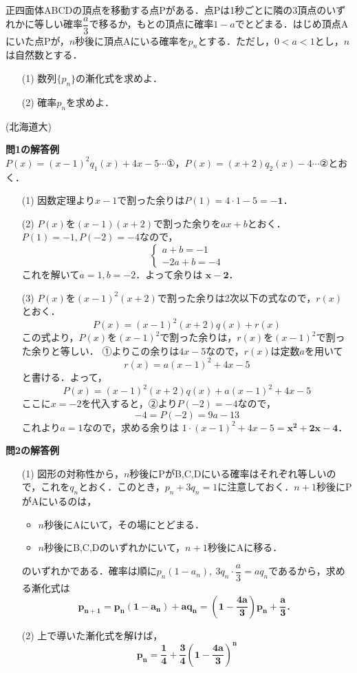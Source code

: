 \documentclass[a4paper,11pt]{ltjsarticle}
\begin{document}
\begin{toi}
正四面体ABCDの頂点を移動する点Pがある．点Pは1秒ごとに隣の3頂点のいずれかに等しい確率$\dfrac a3$で移るか，もとの頂点に確率$1-a$でとどまる．はじめ頂点Aにいた点Pが，$n$秒後に頂点Aにいる確率を$p_n$とする．ただし，$0<a<1$とし，$n$は自然数とする．
\begin{itemize}
    \item [(1)]数列$\{p_n\}$の漸化式を求めよ．
    \item [(2)]確率$p_n$を求めよ．
\end{itemize}
\hfill(北海道大)
\end{toi}

\newpage
\noindent \textbf{問1の解答例}\\[5pt]
$P(x)=(x-1)^2q_1(x)+4x-5 \cdots$①，$P(x)=(x+2)q_2(x)-4 \cdots$②とおく．
\begin{enumerate}
  \item[(1)] 因数定理より$x-1$で割った余りは$P(1)=4\cdot1-5=\boldsymbol{-1}$．
  \item [(2)] $P(x)$を$(x-1)(x+2)$で割った余りを$ax+b$とおく．
  $P(1)=-1, P(-2)=-4$なので，
  \[\begin{cases}
  a+b=-1 \\ -2a+b=-4
  \end{cases}\]
  これを解いて$a=1, b=-2$．よって余りは $\boldsymbol{x-2}$．
  \item[(3)] $P(x)$を$(x-1)^2(x+2)$で割った余りは2次以下の式なので，$r(x)$とおく．
  \[P(x)=(x-1)^2(x+2)q(x)+r(x)\]
  この式より，$P(x)$を$(x-1)^2$で割った余りは，$r(x)$を$(x-1)^2$で割った余りと等しい．
  ①よりこの余りは$4x-5$なので，$r(x)$は定数$a$を用いて
  \[r(x)=a(x-1)^2+4x-5\]
  と書ける．よって，
  \[P(x)=(x-1)^2(x+2)q(x)+a(x-1)^2+4x-5\]
  ここに$x=-2$を代入すると，②より$P(-2)=-4$なので，
  \[-4=P(-2)=9a-13\]
これより$a=1$なので，求める余りは $1\cdot(x-1)^2+4x-5 =\boldsymbol{x^2+2x-4}$．
\end{enumerate}
\textbf{問2の解答例}
\begin{itemize}
    \item [(1)]図形の対称性から，$n$秒後にPがB,C,Dにいる確率はそれぞれ等しいので，これを$q_n$とおく．このとき，$p_n+3q_n=1$に注意しておく．$n+1$秒後にPがAにいるのは，
\begin{itemize}
    \item $n$秒後にAにいて，その場にとどまる．
    \item $n$秒後にB,C,Dのいずれかにいて，$n+1$秒後にAに移る．
\end{itemize}
のいずれかである．確率は順に$p_n(1-a_n),~3q_n\cdot \dfrac a3=aq_n$であるから，求める漸化式は
\[\boldsymbol{p_{n+1}=p_n(1-a_n)+aq_n=\left(1-\frac{4a}3\right)p_n+\frac a3．}\]
    \item [(2)]上で導いた漸化式を解けば，\[\boldsymbol{p_n=\frac14+\frac34\left(1-\frac{4a}{3}\right)^n}\]
\end{itemize}
\end{document}
